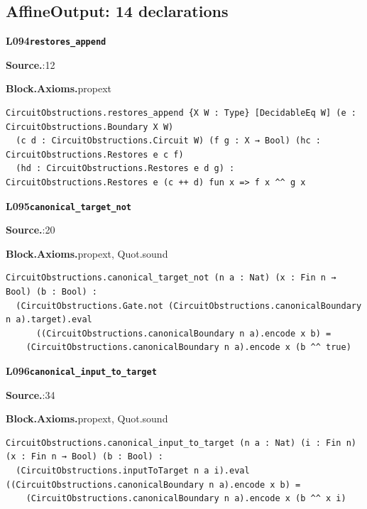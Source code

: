 \subsection*{AffineOutput: 14 declarations}
\par\medskip\noindent\begin{minipage}{\textwidth}
{\small\bfseries L094\enspace\texttt{restores\_append}\par}
{\footnotesize\raggedright\textbf{Source.}\enspace{}:12\par
\textbf{Block.}\quad\textbf{Axioms.}\enspace propext\par}\nopagebreak
\begin{lstlisting}
CircuitObstructions.restores_append {X W : Type} [DecidableEq W] (e : CircuitObstructions.Boundary X W)
  (c d : CircuitObstructions.Circuit W) (f g : X → Bool) (hc : CircuitObstructions.Restores e c f)
  (hd : CircuitObstructions.Restores e d g) : CircuitObstructions.Restores e (c ++ d) fun x => f x ^^ g x
\end{lstlisting}
\end{minipage}\par

\par\medskip\noindent\begin{minipage}{\textwidth}
{\small\bfseries L095\enspace\texttt{canonical\_target\_not}\par}
{\footnotesize\raggedright\textbf{Source.}\enspace{}:20\par
\textbf{Block.}\quad\textbf{Axioms.}\enspace propext, Quot.sound\par}\nopagebreak
\begin{lstlisting}
CircuitObstructions.canonical_target_not (n a : Nat) (x : Fin n → Bool) (b : Bool) :
  (CircuitObstructions.Gate.not (CircuitObstructions.canonicalBoundary n a).target).eval
      ((CircuitObstructions.canonicalBoundary n a).encode x b) =
    (CircuitObstructions.canonicalBoundary n a).encode x (b ^^ true)
\end{lstlisting}
\end{minipage}\par

\par\medskip\noindent\begin{minipage}{\textwidth}
{\small\bfseries L096\enspace\texttt{canonical\_input\_to\_target}\par}
{\footnotesize\raggedright\textbf{Source.}\enspace{}:34\par
\textbf{Block.}\quad\textbf{Axioms.}\enspace propext, Quot.sound\par}\nopagebreak
\begin{lstlisting}
CircuitObstructions.canonical_input_to_target (n a : Nat) (i : Fin n) (x : Fin n → Bool) (b : Bool) :
  (CircuitObstructions.inputToTarget n a i).eval ((CircuitObstructions.canonicalBoundary n a).encode x b) =
    (CircuitObstructions.canonicalBoundary n a).encode x (b ^^ x i)
\end{lstlisting}
\end{minipage}\par

